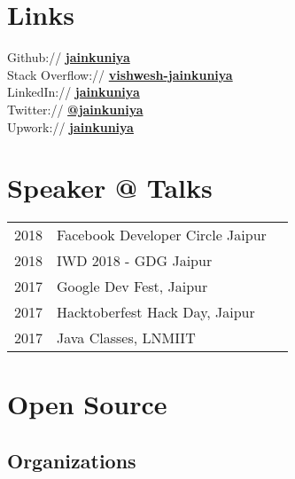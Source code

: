 \documentclass[a4paper]{deedy-resume} %
\begin{document}
\begin{minipage}[t]{0.33\textwidth}
    \section{Links} 
    
    Github:// \href{https://github.com/jainkuniya}{\bf jainkuniya} \\
    Stack Overflow:// \href{https://stackoverflow.com/users/5612089/vishwesh-jainkuniya}{\bf vishwesh-jainkuniya} \\
    LinkedIn:// \href{https://www.linkedin.com/in/jainkuniya}{\bf jainkuniya} \\
    Twitter:// \href{https://twitter.com/jainkuniya}{\bf @jainkuniya} \\
    Upwork:// \href{https://www.upwork.com/freelancers/~01841c33fc6a947c91}{\bf jainkuniya}
    
    \sectionspace %
    
    
    \section{Speaker @ Talks}
    
    \begin{tabular}{rll}
    2018 & Facebook Developer Circle Jaipur\\
    2018 & IWD 2018 - GDG Jaipur\\
    2017 & Google Dev Fest, Jaipur\\
    2017 & Hacktoberfest Hack Day, Jaipur\\
    2017 & Java Classes, LNMIIT\\
    \end{tabular}
    
    \sectionspace %
    
    
    \section{Open Source}
    \subsection{Organizations}
    

\end{minipage}
\end{document}
